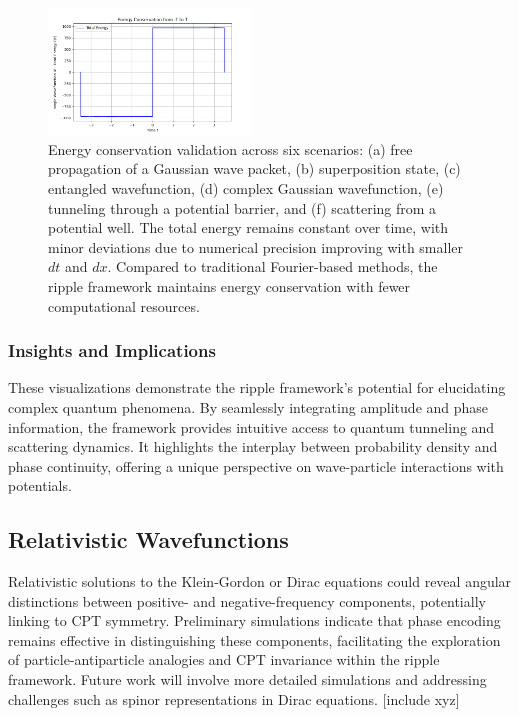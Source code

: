 \documentclass[12pt]{article}
\begin{document}
\begin{figure}[H]
    \includegraphics[width=0.48\textwidth]{images/energy_conservation_scattering.png}
    \caption{Energy conservation validation across six scenarios: (a) free propagation of a Gaussian wave packet, (b) superposition state, (c) entangled wavefunction, (d) complex Gaussian wavefunction, (e) tunneling through a potential barrier, and (f) scattering from a potential well. The total energy remains constant over time, with minor deviations due to numerical precision improving with smaller \(dt\) and \(dx\). Compared to traditional Fourier-based methods, the ripple framework maintains energy conservation with fewer computational resources.}
    \label{fig:energy_conservation}
\end{figure}

\subsubsection{Insights and Implications}

These visualizations demonstrate the ripple framework’s potential for elucidating complex quantum phenomena. By seamlessly integrating amplitude and phase information, the framework provides intuitive access to quantum tunneling and scattering dynamics. It highlights the interplay between probability density and phase continuity, offering a unique perspective on wave-particle interactions with potentials.

\subsection{Relativistic Wavefunctions}
Relativistic solutions to the Klein-Gordon or Dirac equations could reveal angular distinctions between positive- and negative-frequency components, potentially linking to CPT symmetry. Preliminary simulations indicate that phase encoding remains effective in distinguishing these components, facilitating the exploration of particle-antiparticle analogies and CPT invariance within the ripple framework. Future work will involve more detailed simulations and addressing challenges such as spinor representations in Dirac equations. [include xyz]
\end{document}
